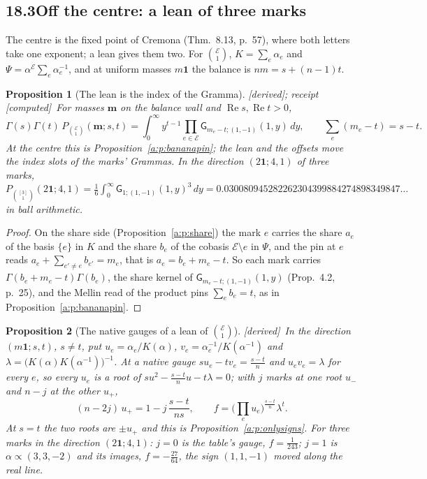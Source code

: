 \documentclass[11pt]{article}
\newcommand{\cE}{\mathcal E}
\newcommand{\one}{\mathbf 1}
\newcommand{\mvec}{\mathbf m}
\newcommand{\sG}{\mathsf G}
\DeclareMathOperator{\re}{Re}
\theoremstyle{plain}
\newtheorem{proposition}{Proposition}[section]
\theoremstyle{definition}
\theoremstyle{remark}
\newcommand{\derived}{\textup{[derived]}}
\newcommand{\computed}{\textup{[computed]}}
\begin{document}
\subsection*{18.3\quad Off the centre: a lean of three marks}

The centre is the fixed point of Cremona (Thm.~8.13, p.~57), where both letters take one exponent; a lean gives them two. For $\binom{\cE}1$, $K=\sum_e\alpha_e$ and $\Psi=\alpha^{\cE}\sum_e\alpha_e^{-1}$, and at uniform masses $m\one$ the balance is $nm=s+(n-1)t$.

\begin{proposition}[The lean is the index of the Gramma]\label{a:p:leanindex}\derived; receipt \computed\
For masses $\mvec$ on the balance wall and $\re s,\re t>0$,
\[
\Gamma(s)\Gamma(t)\,P_{\binom{\cE}1}(\mvec;s,t)=\int_0^\infty y^{t-1}\prod_{e\in\cE}\sG_{m_e-t;(1,-1)}(1,y)\,dy ,\qquad \sum_e(m_e-t)=s-t .
\]
At the centre this is Proposition~\ref{a:p:bananapin}; the lean and the offsets move the index slots of the marks' Grammas. In the direction $(2\one;4,1)$ of three marks, $P_{\binom{[3]}1}(2\one;4,1)=\frac16\int_0^\infty\sG_{1;(1,-1)}(1,y)^3\,dy=0.030080945282262304399884274898349847\ldots$ in ball arithmetic.
\end{proposition}

\begin{proof}
On the share side (Proposition~\ref{a:p:share}) the mark $e$ carries the share $a_e$ of the basis $\{e\}$ in $K$ and the share $b_e$ of the cobasis $\cE\setminus e$ in $\Psi$, and the pin at $e$ reads $a_e+\sum_{e'\ne e}b_{e'}=m_e$, that is $a_e=b_e+m_e-t$. So each mark carries $\Gamma(b_e+m_e-t)\Gamma(b_e)$, the share kernel of $\sG_{m_e-t;(1,-1)}(1,y)$ (Prop.~4.2, p.~25), and the Mellin read of the product pins $\sum_eb_e=t$, as in Proposition~\ref{a:p:bananapin}.
\end{proof}

\begin{proposition}[The native gauges of a lean of $\binom{\cE}1$]\label{a:p:leangauges}\derived\
In the direction $(m\one;s,t)$, $s\ne t$, put $u_e=\alpha_e/K(\alpha)$, $v_e=\alpha_e^{-1}/K(\alpha^{-1})$ and $\lambda=\big(K(\alpha)K(\alpha^{-1})\big)^{-1}$. At a native gauge $su_e-tv_e=\frac{s-t}n$ and $u_ev_e=\lambda$ for every $e$, so every $u_e$ is a root of $su^2-\frac{s-t}nu-t\lambda=0$; with $j$ marks at one root $u_-$ and $n-j$ at the other $u_+$,
\[
(n-2j)\,u_+=1-j\,\frac{s-t}{ns},\qquad f=\Big(\prod_eu_e\Big)^{\frac{s-t}n}\lambda^t .
\]
At $s=t$ the two roots are $\pm u_+$ and this is Proposition~\ref{a:p:onlysigns}. For three marks in the direction $(2\one;4,1)$: $j=0$ is the table's gauge, $f=\frac1{243}$; $j=1$ is $\alpha\propto(3,3,-2)$ and its images, $f=-\frac{27}{64}$, the sign $(1,1,-1)$ moved along the real line.
\end{proposition}
\end{document}
